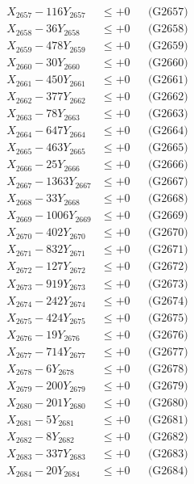 \documentclass[a4paper,10pt]{article}
\begin{document}
{\begin{align}
X_{2657} - 116Y_{2657} &\leq +0 && \text{(G2657)} \\
X_{2658} - 36Y_{2658} &\leq +0 && \text{(G2658)} \\
X_{2659} - 478Y_{2659} &\leq +0 && \text{(G2659)} \\
X_{2660} - 30Y_{2660} &\leq +0 && \text{(G2660)} \\
\allowbreak
X_{2661} - 450Y_{2661} &\leq +0 && \text{(G2661)} \\
X_{2662} - 377Y_{2662} &\leq +0 && \text{(G2662)} \\
X_{2663} - 78Y_{2663} &\leq +0 && \text{(G2663)} \\
X_{2664} - 647Y_{2664} &\leq +0 && \text{(G2664)} \\
X_{2665} - 463Y_{2665} &\leq +0 && \text{(G2665)} \\
X_{2666} - 25Y_{2666} &\leq +0 && \text{(G2666)} \\
X_{2667} - 1363Y_{2667} &\leq +0 && \text{(G2667)} \\
X_{2668} - 33Y_{2668} &\leq +0 && \text{(G2668)} \\
X_{2669} - 1006Y_{2669} &\leq +0 && \text{(G2669)} \\
X_{2670} - 402Y_{2670} &\leq +0 && \text{(G2670)} \\
\allowbreak
X_{2671} - 832Y_{2671} &\leq +0 && \text{(G2671)} \\
X_{2672} - 127Y_{2672} &\leq +0 && \text{(G2672)} \\
X_{2673} - 919Y_{2673} &\leq +0 && \text{(G2673)} \\
X_{2674} - 242Y_{2674} &\leq +0 && \text{(G2674)} \\
X_{2675} - 424Y_{2675} &\leq +0 && \text{(G2675)} \\
X_{2676} - 19Y_{2676} &\leq +0 && \text{(G2676)} \\
X_{2677} - 714Y_{2677} &\leq +0 && \text{(G2677)} \\
X_{2678} - 6Y_{2678} &\leq +0 && \text{(G2678)} \\
X_{2679} - 200Y_{2679} &\leq +0 && \text{(G2679)} \\
X_{2680} - 201Y_{2680} &\leq +0 && \text{(G2680)} \\
\allowbreak
X_{2681} - 5Y_{2681} &\leq +0 && \text{(G2681)} \\
X_{2682} - 8Y_{2682} &\leq +0 && \text{(G2682)} \\
X_{2683} - 337Y_{2683} &\leq +0 && \text{(G2683)} \\
X_{2684} - 20Y_{2684} &\leq +0 && \text{(G2684)} \\

\end{align}}
\end{document}
